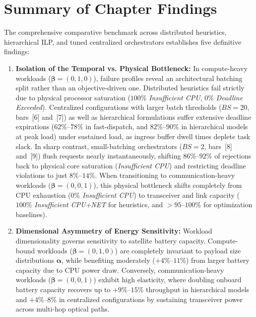 \section{Summary of Chapter Findings}
\label{sec:bench_summary}

The comprehensive comparative benchmark across distributed heuristics, hierarchical ILP, and tuned centralized orchestrators establishes five definitive findings:

\begin{enumerate}
    \item \textbf{Isolation of the Temporal vs. Physical Bottleneck:} 
    In compute-heavy workloads ($\boldsymbol{\beta} = (0, 1, 0)$), failure profiles reveal an architectural batching split rather than an objective-driven one. Distributed heuristics fail strictly due to physical processor saturation ($100\%$ \textit{Insufficient CPU}, $0\%$ \textit{Deadline Exceeded}). Centralized configurations with larger batch thresholds ($BS = 20$, bars~[6] and~[7]) as well as hierarchical formulations suffer extensive deadline expirations ($62\%\text{--}78\%$ in fast-dispatch, and $82\%\text{--}90\%$ in hierarchical models at peak load) under sustained load, as ingress buffer dwell times deplete task slack. In sharp contrast, small-batching orchestrators ($BS = 2$, bars~[8] and~[9]) flush requests nearly instantaneously, shifting $86\%\text{--}92\%$ of rejections back to physical core saturation (\textit{Insufficient CPU}) and restricting deadline violations to just $8\%\text{--}14\%$. When transitioning to communication-heavy workloads ($\boldsymbol{\beta} = (0, 0, 1)$), this physical bottleneck shifts completely from CPU exhaustion ($0\%$ \textit{Insufficient CPU}) to transceiver and link capacity ($100\%$ \textit{Insufficient CPU+NET} for heuristics, and $>95\text{--}100\%$ for optimization baselines).

    \item \textbf{Dimensional Asymmetry of Energy Sensitivity:} 
    Workload dimensionality governs sensitivity to satellite battery capacity. Compute-bound workloads ($\boldsymbol{\beta} = (0, 1, 0)$) are completely invariant to payload size distributions $\boldsymbol{\alpha}$, while benefiting moderately ($+4\%\text{--}11\%$) from larger battery capacity due to CPU power draw. Conversely, communication-heavy workloads ($\boldsymbol{\beta} = (0, 0, 1)$) exhibit high elasticity, where doubling onboard battery capacity recovers up to $+9\%\text{--}15\%$ throughput in hierarchical models and $+4\%\text{--}8\%$ in centralized configurations by sustaining transceiver power across multi-hop optical paths.


\end{enumerate}
